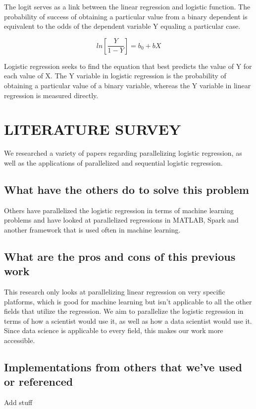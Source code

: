 \documentclass[letterpaper, 10 pt, conference]{ieeeconf}  %
\begin{document}
The logit serves as a link between the linear regression and logistic function. The probability of success of obtaining a particular value from a binary dependent is equivalent to the odds of the dependent variable Y equaling a particular case.

$$ln[\frac{Y}{1-Y}] = b_0 + bX$$

Logistic regression seeks to find the equation that best predicts the value of Y for each value of X. The Y variable in logistic regression is the probability of obtaining a particular value of a binary variable, whereas the Y variable in linear regression is measured directly. %


\section{LITERATURE SURVEY}

We researched a variety of papers regarding parallelizing logistic regression, as well as the applications of parallelized and sequential logistic regression.

\subsection{What have the others do to solve this problem}
Others have parallelized the logistic regression in terms of machine learning problems and have looked at parallelized regressions in MATLAB, Spark and another framework that is used often in machine learning.

\subsection{What are the pros and cons of this previous work}
This research only looks at parallelizing linear regression on very specific platforms, which is good for machine learning but isn’t applicable to all the other fields that utilize the regression. We aim to parallelize the logistic regression in terms of how a scientist would use it, as well as how a data scientist would use it. Since data science is applicable to every field, this makes our work more accessible. 

\subsection{Implementations from others that we’ve used or referenced} 
Add stuff
\end{document}
